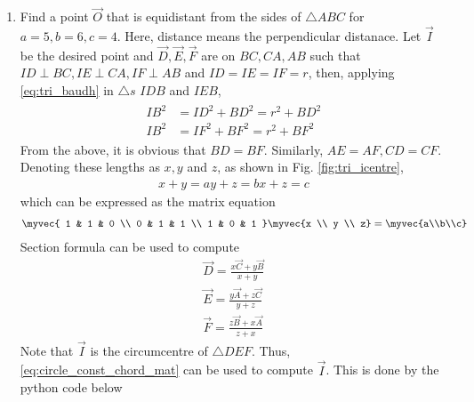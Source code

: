 \renewcommand{\theequation}{\theenumi}
\begin{enumerate}[label=\arabic*.,ref=\thesubsection.\theenumi]

\item Find a point $\vec{O}$ that is equidistant from the sides of $\triangle ABC$ for $a = 5, b = 6, c = 4$. Here, distance means the perpendicular distanace.
%
\solution Let $\vec{I}$ be the desired point and  $\vec{D}, \vec{E}, \vec{F}$ are on  $BC, CA, AB$ such that $ID \perp BC, IE \perp CA, IF \perp AB$ and $ID = IE = IF = r$, then, applying \eqref{eq:tri_baudh} in $\triangle s$ $IDB$ and $IEB$,
\begin{align}
\label{eq:tri_icentre_baudhd}
\begin{split}
IB^2 &= ID^2+BD^2 = r^2 + BD^2 
\\
IB^2 &= IF^2+BF^2 = r^2 + BF^2
\end{split}
\end{align}
From the above, it is obvious that $BD = BF$. Similarly, $AE = AF, CD = CF$.  Denoting these lengths as $x, y$ and $z$, as shown in Fig. \ref{fig:tri_icentre},
%
\begin{align}
x + y = a
y+z = b
x + z = c
\end{align}
%
which can be expressed as the matrix equation
%
\begin{align}
\myvec{
1 & 1 & 0
\\
0 & 1 & 1
\\
1 & 0 & 1
}
\myvec{x \\ y \\ z}
=
\myvec{a\\b\\c}
\label{eq:tri_icentre_mat}
\end{align}
%
Section formula can be used to compute 
\begin{align}
\vec{D} = \frac{x\vec{C}+y\vec{B}}{x+y}
\\
\vec{E} = \frac{y\vec{A}+z\vec{C}}{y+z}
\\
\vec{F} = \frac{z\vec{B}+x\vec{A}}{z+x}
\end{align}
%
Note that $\vec{I}$ is the circumcentre of $\triangle DEF$.  Thus, \eqref{eq:circle_const_chord_mat} can be used to compute $\vec{I}$.  
%
This is done by the python code below
%
\begin{lstlisting}

\end{lstlisting}
\end{enumerate}

